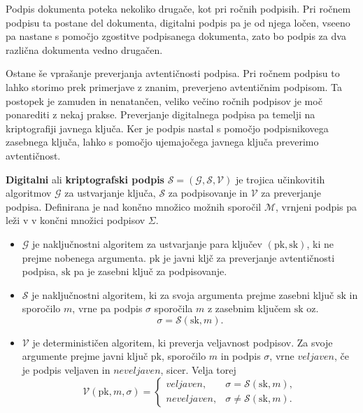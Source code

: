 \documentclass[isrm2, tisk]{fmfdelo}
\begin{document}
Podpis dokumenta poteka nekoliko drugače, kot pri ročnih podpisih. Pri ročnem podpisu ta postane del 
dokumenta, digitalni podpis pa je od njega ločen, vseeno pa nastane s pomočjo zgostitve podpisanega 
dokumenta, zato bo podpis za dva različna dokumenta vedno drugačen.

Ostane še vprašanje preverjanja avtentičnosti podpisa. Pri ročnem podpisu to lahko storimo prek 
primerjave z znanim, preverjeno avtentičnim podpisom. Ta postopek je zamuden in nenatančen, veliko 
večino ročnih podpisov je moč ponarediti z nekaj prakse. Preverjanje digitalnega podpisa pa temelji 
na kriptografiji javnega ključa. Ker je podpis nastal s pomočjo podpisnikovega zasebnega ključa,
lahko s pomočjo ujemajočega javnega ključa preverimo avtentičnost.

\begin{definicija}
\label{def:digisig}
    \textbf{Digitalni} ali \textbf{kriptografski podpis} $\mathcal{S} = (\mathcal{G}, \mathcal{S}, 
    \mathcal{V})$ je trojica učinkovitih algoritmov $\mathcal{G}$ za ustvarjanje ključa, $\mathcal{S}$ 
    za podpisovanje in $\mathcal{V}$ za preverjanje podpisa. Definirana je nad končno množico možnih 
    sporočil $\mathcal{M}$, vrnjeni podpis pa leži v v končni množici podpisov $\Sigma$.
    \begin{itemize}
        \item $\mathcal{G}$ je naključnostni algoritem za ustvarjanje para ključev $(\text{pk}, \text{sk})$, 
            ki ne prejme nobenega argumenta. $\text{pk}$ je javni kljč za preverjanje avtentičnosti 
            podpisa, $\text{sk}$ pa je zasebni ključ za podpisovanje. 
        \item $\mathcal{S}$ je naključnostni algoritem, ki za svoja argumenta prejme zasebni ključ $\text{sk}$ 
            in sporočilo $m$, vrne pa podpis $\sigma$ sporočila $m$ z zasebnim ključem $\text{sk}$
            oz.\ 
            $$ 
            \sigma = \mathcal{S}(\text{sk}, m).
            $$
        \item $\mathcal{V}$ je determinističen algoritem, ki preverja veljavnost podpisov. Za svoje argumente
            prejme javni ključ $\text{pk}$, sporočilo $m$ in podpis $\sigma$, vrne $veljaven$, če je podpis 
            veljaven in $neveljaven$, sicer. Velja torej
            $$ 
            \mathcal{V}(\text{pk}, m, \sigma) = 
            \begin{cases}
                veljaven, & \sigma = \mathcal{S}(\text{sk}, m), \\
                neveljaven, & \sigma \neq \mathcal{S}(\text{sk}, m).
            \end{cases}
            $$
    \end{itemize}
\end{definicija}
\end{document}
